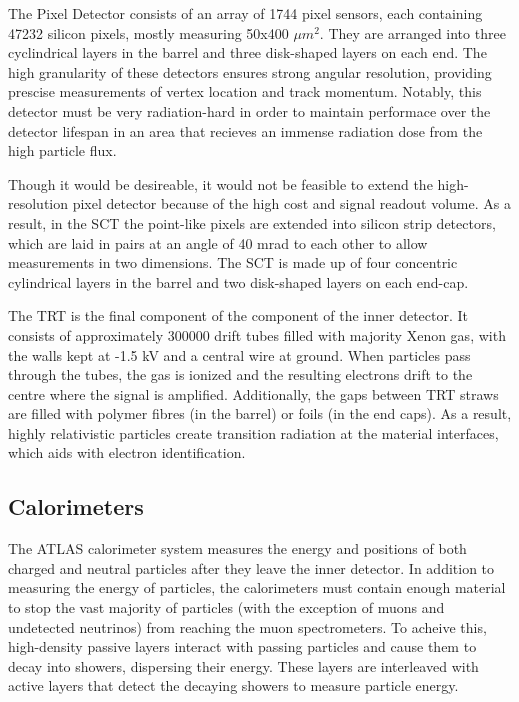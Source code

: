 The Pixel Detector consists of an array of 1744 pixel sensors, each containing 47232 silicon pixels, mostly measuring 50x400 $\mu m^2$. They are arranged into three cyclindrical layers in the barrel and three disk-shaped layers on each end. The high granularity of these detectors ensures strong angular resolution, providing prescise measurements of vertex location and track momentum. Notably, this detector must be very radiation-hard in order to maintain performace over the detector lifespan in an area that recieves an immense radiation dose from the high particle flux.

Though it would be desireable, it would not be feasible to extend the high-resolution pixel detector because of the high cost and signal readout volume. As a result, in the SCT the point-like pixels are extended into silicon strip detectors, which are laid in pairs at an angle of 40 mrad to each other to allow measurements in two dimensions. The SCT is made up of four concentric cylindrical layers in the barrel and two disk-shaped layers on each end-cap.

The TRT is the final component of the component of the inner detector.  It consists of approximately 300000 drift tubes filled with majority Xenon gas, with the walls kept at -1.5 kV and a central wire at ground. When particles pass through the tubes, the gas is ionized and the resulting electrons drift to the centre where the signal is amplified. Additionally, the gaps between TRT straws are filled with polymer fibres (in the barrel) or foils (in the end caps). As a result, highly relativistic particles create transition radiation at the material interfaces, which aids with electron identification.

\subsection{Calorimeters}
The ATLAS calorimeter system measures the energy and positions of both charged and neutral particles after they leave the inner detector. In addition to measuring the energy of particles, the calorimeters must contain enough material to stop the vast majority of particles (with the exception of muons and undetected neutrinos) from reaching the muon spectrometers. To acheive this, high-density passive layers interact with passing particles and cause them to decay into showers, dispersing their energy. These layers are interleaved with active layers that detect the decaying showers to measure particle energy.

